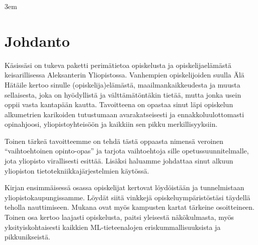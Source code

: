 \documentclass[a5paper, 8pt, twocolumn]{book} %
\numberwithin{equation}{section}
\begin{document}
\begingroup
\makeatletter
\def\@makeschapterhead#1{%
	{\parindent \z@ \raggedright
		\normalfont
		\interlinepenalty\@M
		\Huge \bfseries  #1\par\nobreak
		\vskip 40\p@
}}
\makeatother
\setcounter{secnumdepth}{0}
\setcounter{tocdepth}{1}

\tableofcontents
\endgroup

\emergencystretch 3em
\chapter{Johdanto}
Käsissäsi on tukeva paketti perimä\-tietoa opiskelusta ja opiskelija\-elämästä keisarillisessa Aleksanterin Yliopistossa. Vanhempien opiskelijoiden suulla Älä Hätäile kertoo sinulle (opiskelija)elämästä, maailmankaikkeudesta ja muusta sellaisesta, joka on hyödyllistä ja välttämätöntäkin tietää, mutta jonka usein oppii vasta kantapään kautta. Tavoitteena on opastaa sinut läpi opiskelun alkumetrien karikoiden tutustumaan avarakatseisesti ja ennakkoluulottomasti opinahjoosi, yliopistoyhteisöön ja kaikkiin sen pikku merkillisyyksiin. 

Toinen tärkeä tavoitteemme on tehdä tästä oppaasta nimensä veroinen ``vaihtoehtoinen opinto-opas'' ja tarjota vaihtoehtoja sille opetussuunnitelmalle, jota yliopisto virallisesti esittää. Lisäksi haluamme johdattaa sinut alkuun yliopiston tietotekniikkajärjestelmien käytössä. 

Kirjan ensimmäisessä osassa opiskelijat kertovat löydöistään ja tunnelmistaan yli\-opisto\-kaupungissamme. Löydät siitä vinkkejä opiskelu\-ympäristöstäsi täydellä teholla nauttimiseen. Mukana ovat myös kampusten kartat tärkeine osoitteineen. Toinen osa kertoo laajasti opiskelusta, paitsi yleisestä näkökulmasta, myös yksityis\-kohtaisesti kaikkien ML-tieteen\-alojen eris\-kummallisuuksista ja pikku\-nikseistä. 
\end{document}
